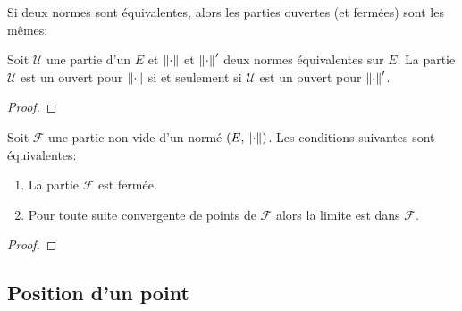                                 \noindent Si deux normes sont équivalentes, alors les parties ouvertes (et fermées) sont les mêmes:
                                \begin{proposition}
                                    Soit $\mathcal U$ une partie d'un \rev{} $E$ et $\left\lVert\cdot\right\rVert$ et $\left\lVert\cdot\right\rVert'$ deux normes équivalentes sur $E$. La partie  $\mathcal U$ est un ouvert pour $\left\lVert\cdot\right\rVert$ si et seulement si $\mathcal U$ est un ouvert pour $\left\lVert\cdot\right\rVert'$.
                                \end{proposition}

                                \begin{proof}
                                    \pl{\rep{8cm}	}

                                \end{proof}


                                \begin{proposition}
                                    Soit $\mathcal F$ une partie non vide d'un \rev{} normé $(E,\left\lVert\cdot\right\rVert)$. Les conditions suivantes sont équivalentes:
                                    \begin{enumerate}
                                        \item La partie $\mathcal F$ est fermée.
                                        \item Pour toute suite convergente de points de $\mathcal F$ alors la limite est dans $\mathcal F$.
                                    \end{enumerate}
                                \end{proposition}

                                \begin{proof}
                                    \pl{\rep{10cm}	}

                                \end{proof}

                                \sld{\vfill\pagebreak[5]}%
                                \subsection{Position d'un point}

